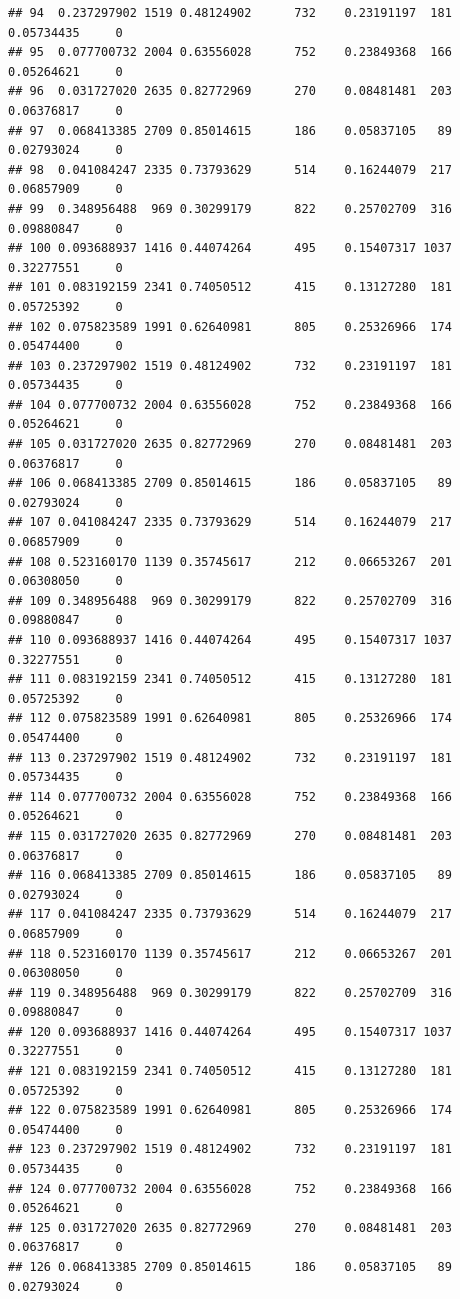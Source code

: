 \documentclass[
]{article}
\begin{document}
\begin{verbatim}
## 94  0.237297902 1519 0.48124902      732    0.23191197  181 0.05734435     0
## 95  0.077700732 2004 0.63556028      752    0.23849368  166 0.05264621     0
## 96  0.031727020 2635 0.82772969      270    0.08481481  203 0.06376817     0
## 97  0.068413385 2709 0.85014615      186    0.05837105   89 0.02793024     0
## 98  0.041084247 2335 0.73793629      514    0.16244079  217 0.06857909     0
## 99  0.348956488  969 0.30299179      822    0.25702709  316 0.09880847     0
## 100 0.093688937 1416 0.44074264      495    0.15407317 1037 0.32277551     0
## 101 0.083192159 2341 0.74050512      415    0.13127280  181 0.05725392     0
## 102 0.075823589 1991 0.62640981      805    0.25326966  174 0.05474400     0
## 103 0.237297902 1519 0.48124902      732    0.23191197  181 0.05734435     0
## 104 0.077700732 2004 0.63556028      752    0.23849368  166 0.05264621     0
## 105 0.031727020 2635 0.82772969      270    0.08481481  203 0.06376817     0
## 106 0.068413385 2709 0.85014615      186    0.05837105   89 0.02793024     0
## 107 0.041084247 2335 0.73793629      514    0.16244079  217 0.06857909     0
## 108 0.523160170 1139 0.35745617      212    0.06653267  201 0.06308050     0
## 109 0.348956488  969 0.30299179      822    0.25702709  316 0.09880847     0
## 110 0.093688937 1416 0.44074264      495    0.15407317 1037 0.32277551     0
## 111 0.083192159 2341 0.74050512      415    0.13127280  181 0.05725392     0
## 112 0.075823589 1991 0.62640981      805    0.25326966  174 0.05474400     0
## 113 0.237297902 1519 0.48124902      732    0.23191197  181 0.05734435     0
## 114 0.077700732 2004 0.63556028      752    0.23849368  166 0.05264621     0
## 115 0.031727020 2635 0.82772969      270    0.08481481  203 0.06376817     0
## 116 0.068413385 2709 0.85014615      186    0.05837105   89 0.02793024     0
## 117 0.041084247 2335 0.73793629      514    0.16244079  217 0.06857909     0
## 118 0.523160170 1139 0.35745617      212    0.06653267  201 0.06308050     0
## 119 0.348956488  969 0.30299179      822    0.25702709  316 0.09880847     0
## 120 0.093688937 1416 0.44074264      495    0.15407317 1037 0.32277551     0
## 121 0.083192159 2341 0.74050512      415    0.13127280  181 0.05725392     0
## 122 0.075823589 1991 0.62640981      805    0.25326966  174 0.05474400     0
## 123 0.237297902 1519 0.48124902      732    0.23191197  181 0.05734435     0
## 124 0.077700732 2004 0.63556028      752    0.23849368  166 0.05264621     0
## 125 0.031727020 2635 0.82772969      270    0.08481481  203 0.06376817     0
## 126 0.068413385 2709 0.85014615      186    0.05837105   89 0.02793024     0

\end{verbatim}
\end{document}
